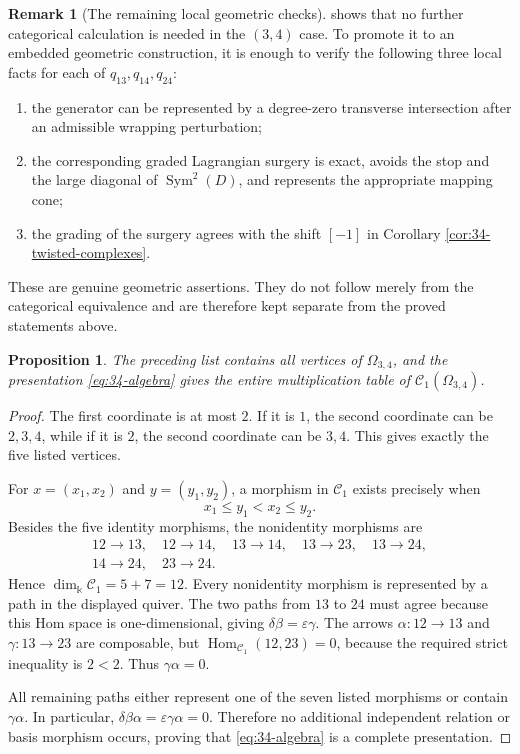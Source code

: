 \documentclass[12pt,a4paper,english,reqno]{amsart}
\theoremstyle{plain}
\newtheorem{proposition}[theorem]{Proposition}
\theoremstyle{definition}
\newtheorem{remark}[theorem]{Remark}
\newcommand{\kk}{\Bbbk}
\newcommand{\Hom}{\operatorname{Hom}}
\newcommand{\C}{\mathcal C}
\begin{document}
\begin{remark}[The remaining local geometric checks]
\label{rem:34-surgery-checks}
 shows that no further categorical
calculation is needed in the $(3,4)$ case.  To promote it to an embedded
geometric construction, it is enough to verify the following three local
facts for each of $q_{13},q_{14},q_{24}$:
\begin{enumerate}
\item the generator can be represented by a degree-zero transverse
intersection after an admissible wrapping perturbation;
\item the corresponding graded Lagrangian surgery is exact, avoids the
stop and the large diagonal of $\operatorname{Sym}^2(D)$, and represents
the appropriate mapping cone;
\item the grading of the surgery agrees with the shift $[-1]$ in
Corollary \ref{cor:34-twisted-complexes}.
\end{enumerate}
These are genuine geometric assertions.  They do not follow merely from
the categorical equivalence and are therefore kept separate from the
proved statements above.
\end{remark}

\begin{proposition}
\label{prop:34-full-check}
The preceding list contains all vertices of $\Omega_{3,4}$, and the
presentation \eqref{eq:34-algebra} gives the entire multiplication table of
$\C_1(\Omega_{3,4})$.
\end{proposition}

\begin{proof}
The first coordinate is at most $2$.  If it is $1$, the second
coordinate can be $2,3,4$, while if it is $2$, the second coordinate can
be $3,4$.  This gives exactly the five listed vertices.

For $x=(x_1,x_2)$ and $y=(y_1,y_2)$, a morphism in $\C_1$ exists
precisely when
\[
 x_1\leq y_1<x_2\leq y_2.
\]
Besides the five identity morphisms, the nonidentity morphisms are
\[
\begin{gathered}
12\to13,\quad 12\to14,\quad
13\to14,\quad13\to23,\quad13\to24,\\
14\to24,\quad23\to24.
\end{gathered}
\]
Hence $\dim_{\kk}\C_1=5+7=12$.  Every nonidentity morphism is
represented by a path in the displayed quiver.  The two paths from $13$
to $24$ must agree because this Hom space is one-dimensional, giving
$\delta\beta=\varepsilon\gamma$.  The arrows
$\alpha\colon12\to13$ and $\gamma\colon13\to23$ are composable, but
$\Hom_{\C_1}(12,23)=0$, because the required strict inequality is
$2<2$.  Thus $\gamma\alpha=0$.

All remaining paths either represent one of the seven listed morphisms or
contain $\gamma\alpha$.  In particular,
$\delta\beta\alpha=\varepsilon\gamma\alpha=0$.  Therefore no additional
independent relation or basis morphism occurs, proving that
\eqref{eq:34-algebra} is a complete presentation.
\end{proof}
\end{document}
